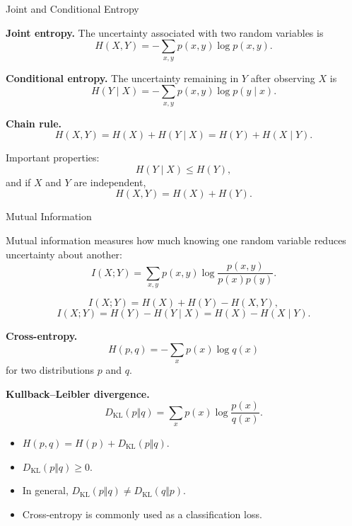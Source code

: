 \documentclass[aspectratio=169,12pt]{beamer}
\begin{document}
\begin{frame}[t]{Joint and Conditional Entropy}
	\vspace{0.2cm}
	
	\textbf{Joint entropy.}
		The uncertainty associated with two random variables is
		\[
		H(X,Y)
		=
		-\sum_{x,y}p(x,y)\log p(x,y).
		\]

	
\textbf{Conditional entropy.}
		The uncertainty remaining in $Y$ after observing $X$ is
		\[
		H(Y\mid X)
		=
		-\sum_{x,y}p(x,y)\log p(y\mid x).
		\]

	
\textbf{Chain rule.}
		\[
		H(X,Y)=H(X)+H(Y\mid X)
		=H(Y)+H(X\mid Y).
		\]
	
	Important properties:
	\[
	H(Y\mid X)\leq H(Y),
	\]
	and if $X$ and $Y$ are independent,
	\[
	H(X,Y)=H(X)+H(Y).
	\]
\end{frame}

\begin{frame}[t]{Mutual Information}
	\vspace{0.2cm}
	

		Mutual information measures how much knowing one random variable
		reduces uncertainty about another:
		\[
		I(X;Y)
		=
		\sum_{x,y}p(x,y)
		\log
		\frac{p(x,y)}{p(x)p(y)}.
		\]
	
		\[
		I(X;Y)
		=
		H(X)+H(Y)-H(X,Y),
		\]
		\[
		I(X;Y)
		=
		H(Y)-H(Y\mid X)
		=
		H(X)-H(X\mid Y).
		\]

	
\end{frame}

\begin{frame}[t]
	\vspace{0.2cm}
	
\textbf{Cross-entropy.}
		\[
		H(p,q)
		=
		-\sum_x p(x)\log q(x)
		\]
for two distributions $p$ and $q$.

	
\textbf{Kullback--Leibler divergence.}
		\[
		D_{\mathrm{KL}}(p\Vert q)
		=
		\sum_x p(x)\log\frac{p(x)}{q(x)}.
		\]

	
	\begin{itemize}
		\item 	$H(p,q)
		=
		H(p)+D_{\mathrm{KL}}(p\Vert q)$.
		\item $D_{\mathrm{KL}}(p\Vert q)\geq 0$.
		\item In general,
		$D_{\mathrm{KL}}(p\Vert q)\neq D_{\mathrm{KL}}(q\Vert p)$.
		\item Cross-entropy is commonly used as a classification loss.
	\end{itemize}
\end{frame}
\end{document}
